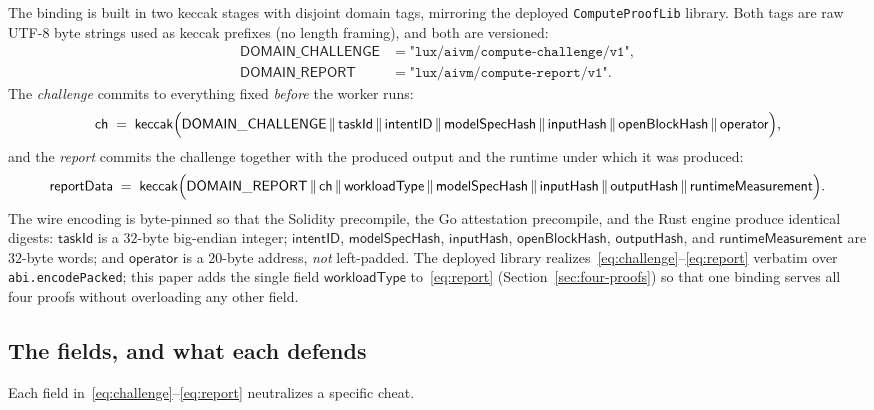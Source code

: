 The binding is built in two keccak stages with disjoint domain tags, mirroring the
deployed \texttt{ComputeProofLib} library. Both tags are raw UTF-8 byte strings
used as keccak prefixes (no length framing), and both are versioned:
\begin{align}
\mathsf{DOMAIN\_CHALLENGE} &= \texttt{"lux/aivm/compute-challenge/v1"}, \\
\mathsf{DOMAIN\_REPORT}    &= \texttt{"lux/aivm/compute-report/v1"}.
\end{align}
The \emph{challenge} commits to everything fixed \emph{before} the worker runs:
\begin{equation}
\label{eq:challenge}
\mathsf{ch} \;=\; \mathsf{keccak}\Bigl(
  \mathsf{DOMAIN\_CHALLENGE} \,\|\,
  \mathsf{taskId} \,\|\,
  \mathsf{intentID} \,\|\,
  \mathsf{modelSpecHash} \,\|\,
  \mathsf{inputHash} \,\|\,
  \mathsf{openBlockHash} \,\|\,
  \mathsf{operator}
\Bigr),
\end{equation}
and the \emph{report} commits the challenge together with the produced output and
the runtime under which it was produced:
\begin{equation}
\label{eq:report}
\mathsf{reportData} \;=\; \mathsf{keccak}\Bigl(
  \mathsf{DOMAIN\_REPORT} \,\|\,
  \mathsf{ch} \,\|\,
  \mathsf{workloadType} \,\|\,
  \mathsf{modelSpecHash} \,\|\,
  \mathsf{inputHash} \,\|\,
  \mathsf{outputHash} \,\|\,
  \mathsf{runtimeMeasurement}
\Bigr).
\end{equation}
The wire encoding is byte-pinned so that the Solidity precompile, the Go
attestation precompile, and the Rust engine produce identical digests:
$\mathsf{taskId}$ is a $32$-byte big-endian integer; $\mathsf{intentID}$,
$\mathsf{modelSpecHash}$, $\mathsf{inputHash}$, $\mathsf{openBlockHash}$,
$\mathsf{outputHash}$, and $\mathsf{runtimeMeasurement}$ are $32$-byte words; and
$\mathsf{operator}$ is a $20$-byte address, \emph{not} left-padded. The deployed
library realizes~\eqref{eq:challenge}--\eqref{eq:report} verbatim over
\texttt{abi.encodePacked}; this paper adds the single field $\mathsf{workloadType}$
to~\eqref{eq:report} (Section~\ref{sec:four-proofs}) so that one binding serves all
four proofs without overloading any other field.

\subsection{The fields, and what each defends}

Each field in~\eqref{eq:challenge}--\eqref{eq:report} neutralizes a specific cheat.

